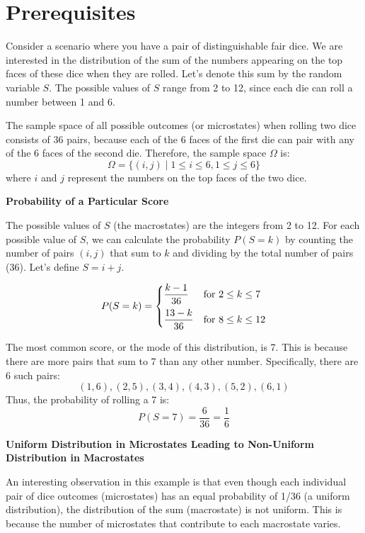 \chapter{Prerequisites}
\label{chap:prerequisites}

Consider a scenario where you have a pair of distinguishable fair dice. We are interested in the distribution of the sum of the numbers appearing on the top faces of these dice when they are rolled. Let's denote this sum by the random variable \( S \). The possible values of \( S \) range from 2 to 12, since each die can roll a number between 1 and 6.

The sample space of all possible outcomes (or microstates) when rolling two dice consists of 36 pairs, because each of the 6 faces of the first die can pair with any of the 6 faces of the second die. Therefore, the sample space \( \Omega \) is:
\[
\Omega = \{(i,j) \mid 1 \leq i \leq 6, 1 \leq j \leq 6\}
\]
where \( i \) and \( j \) represent the numbers on the top faces of the two dice.

\textbf{Probability of a Particular Score}

The possible values of $S$ (the macrostates) are the integers from 2 to 12. For each possible value of \( S \), we can calculate the probability \( P(S = k) \) by counting the number of pairs \((i,j)\) that sum to \( k \) and dividing by the total number of pairs (36). Let’s define \( S = i + j \).

\[
P(S = k) =
\begin{cases}
\dfrac{k-1}{36} & \text{for } 2 \leq k \leq 7 \vspace{5pt} \\
\dfrac{13-k}{36} & \text{for } 8 \leq k \leq 12 
\end{cases}
\]

The most common score, or the mode of this distribution, is 7. This is because there are more pairs that sum to 7 than any other number. Specifically, there are 6 such pairs: 
\[
(1,6), (2,5), (3,4), (4,3), (5,2), (6,1)
\]
Thus, the probability of rolling a 7 is:
\[
P(S = 7) = \frac{6}{36} = \frac{1}{6}
\]

\textbf{Uniform Distribution in Microstates Leading to Non-Uniform Distribution in Macrostates}

An interesting observation in this example is that even though each individual pair of dice outcomes (microstates) has an equal probability of 1/36 (a uniform distribution), the distribution of the sum (macrostate) is not uniform. This is because the number of microstates that contribute to each macrostate varies.

